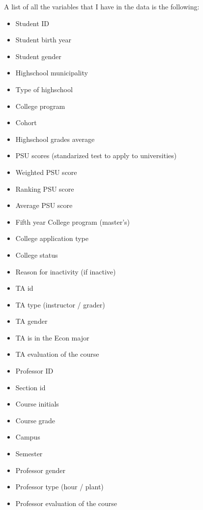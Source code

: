 A list of all the variables that I have in the data is the following:
\begin{itemize}
	\item Student ID
	\item Student birth year
	\item Student gender
	\item Highschool municipality
	\item Type of highschool
	\item College program
	\item Cohort
	\item Highschool grades average
	\item PSU scores (standarized test to apply to universities)
	\item Weighted PSU score
	\item Ranking PSU score
	\item Average PSU score
	\item Fifth year College program (master's)
	\item College application type
	\item College status
	\item Reason for inactivity (if inactive)
	\item TA id
	\item TA type (instructor / grader)
	\item TA gender
	\item TA is in the Econ major
	\item TA evaluation of the course
	\item Professor ID
	\item Section id
	\item Course initials
	\item Course grade
	\item Campus
	\item Semester
	\item Professor gender
	\item Professor type (hour / plant)
	\item Professor evaluation of the course
\end{itemize}






